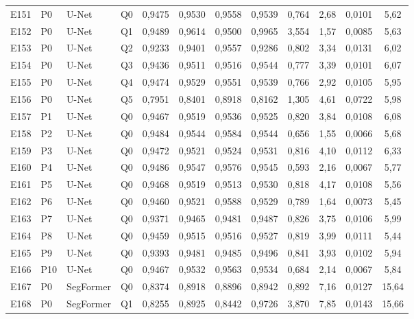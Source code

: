 \begin{longtable}{lllllccccccc}
E151 & P0 & U-Net & Q0 & 0{,}9475 & 0{,}9530 & 0{,}9558 & 0{,}9539 & 0{,}764 & 2{,}68 & 0{,}0101 & 5{,}62 \\
E152 & P0 & U-Net & Q1 & 0{,}9489 & 0{,}9614 & 0{,}9500 & 0{,}9965 & 3{,}554 & 1{,}57 & 0{,}0085 & 5{,}63 \\
E153 & P0 & U-Net & Q2 & 0{,}9233 & 0{,}9401 & 0{,}9557 & 0{,}9286 & 0{,}802 & 3{,}34 & 0{,}0131 & 6{,}02 \\
E154 & P0 & U-Net & Q3 & 0{,}9436 & 0{,}9511 & 0{,}9516 & 0{,}9544 & 0{,}777 & 3{,}39 & 0{,}0101 & 6{,}07 \\
E155 & P0 & U-Net & Q4 & 0{,}9474 & 0{,}9529 & 0{,}9551 & 0{,}9539 & 0{,}766 & 2{,}92 & 0{,}0105 & 5{,}95 \\
E156 & P0 & U-Net & Q5 & 0{,}7951 & 0{,}8401 & 0{,}8918 & 0{,}8162 & 1{,}305 & 4{,}61 & 0{,}0722 & 5{,}98 \\
E157 & P1 & U-Net & Q0 & 0{,}9467 & 0{,}9519 & 0{,}9536 & 0{,}9525 & 0{,}820 & 3{,}84 & 0{,}0108 & 6{,}08 \\
E158 & P2 & U-Net & Q0 & 0{,}9484 & 0{,}9544 & 0{,}9584 & 0{,}9544 & 0{,}656 & 1{,}55 & 0{,}0066 & 5{,}68 \\
E159 & P3 & U-Net & Q0 & 0{,}9472 & 0{,}9521 & 0{,}9524 & 0{,}9531 & 0{,}816 & 4{,}10 & 0{,}0112 & 6{,}33 \\
E160 & P4 & U-Net & Q0 & 0{,}9486 & 0{,}9547 & 0{,}9576 & 0{,}9545 & 0{,}593 & 2{,}16 & 0{,}0067 & 5{,}77 \\
E161 & P5 & U-Net & Q0 & 0{,}9468 & 0{,}9519 & 0{,}9513 & 0{,}9530 & 0{,}818 & 4{,}17 & 0{,}0108 & 5{,}56 \\
E162 & P6 & U-Net & Q0 & 0{,}9460 & 0{,}9521 & 0{,}9588 & 0{,}9529 & 0{,}789 & 1{,}64 & 0{,}0073 & 5{,}45 \\
E163 & P7 & U-Net & Q0 & 0{,}9371 & 0{,}9465 & 0{,}9481 & 0{,}9487 & 0{,}826 & 3{,}75 & 0{,}0106 & 5{,}99 \\
E164 & P8 & U-Net & Q0 & 0{,}9459 & 0{,}9515 & 0{,}9516 & 0{,}9527 & 0{,}819 & 3{,}99 & 0{,}0111 & 5{,}44 \\
E165 & P9 & U-Net & Q0 & 0{,}9393 & 0{,}9481 & 0{,}9485 & 0{,}9496 & 0{,}841 & 3{,}93 & 0{,}0102 & 5{,}94 \\
E166 & P10 & U-Net & Q0 & 0{,}9467 & 0{,}9532 & 0{,}9563 & 0{,}9534 & 0{,}684 & 2{,}14 & 0{,}0067 & 5{,}84 \\
E167 & P0 & SegFormer & Q0 & 0{,}8374 & 0{,}8918 & 0{,}8896 & 0{,}8942 & 0{,}892 & 7{,}16 & 0{,}0127 & 15{,}64 \\
E168 & P0 & SegFormer & Q1 & 0{,}8255 & 0{,}8925 & 0{,}8442 & 0{,}9726 & 3{,}870 & 7{,}85 & 0{,}0143 & 15{,}66 \\

\end{longtable}
